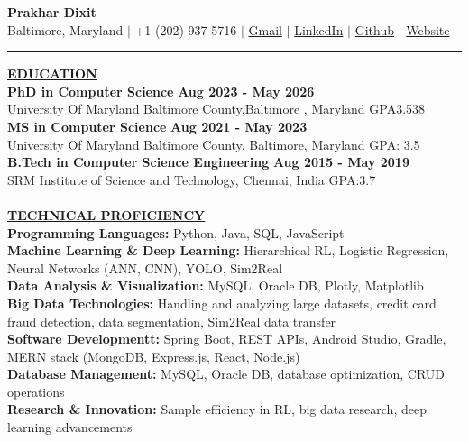 \documentclass{article}
\begin{document}
\begin{center}
\thispagestyle{empty}
\large \textbf{\textbf{Prakhar Dixit}  \\}
\normalsize Baltimore, Maryland $\mid$ +1 (202)-937-5716 $\mid$ \href{mailto:prakhhar1997@gmail.com}{Gmail} $\mid$ \href{https://www.linkedin.com/in/prakhardixit250697/}{LinkedIn} $\mid$  \href{https://github.com/pdx97}{Github} $\mid$  \href{https://pdx97.github.io/}{Website}  \\
\rule{\textwidth}{1pt}
\end{center}

\noindent \textbf{\underline{EDUCATION}} \\
\textbf{PhD in Computer Science} \hfill \textbf{Aug 2023 - May 2026} \\
University Of Maryland Baltimore County,Baltimore , Maryland {GPA3.538} \\
\textbf{MS in Computer Science} \hfill \textbf{Aug 2021 - May 2023} \\
University Of Maryland Baltimore County, Baltimore, Maryland {GPA: 3.5} \\
\textbf{B.Tech in Computer Science Engineering} \hfill \textbf{Aug 2015 - May 2019} \\
SRM Institute of Science and Technology, Chennai, India {GPA:3.7 }
 \\\\
\noindent \textbf{\underline{TECHNICAL PROFICIENCY}} \\
\textbf{Programming Languages:}{ \small  Python, Java, SQL, JavaScript} \\
\textbf{Machine Learning \& Deep Learning:} {\small Hierarchical RL, Logistic Regression, Neural Networks (ANN, CNN), YOLO, Sim2Real}\\
\textbf{Data Analysis \& Visualization:}{ \small  MySQL, Oracle DB, Plotly, Matplotlib}\\
\textbf{Big Data Technologies:}{ \small Handling and analyzing large datasets, credit card fraud detection, data segmentation, Sim2Real data transfer  }\\
\textbf{Software Developmentt:}{ \small Spring Boot, REST APIs, Android Studio, Gradle, MERN stack (MongoDB, Express.js, React, Node.js) }\\
\textbf{Database Management:}{ \small MySQL, Oracle DB, database optimization, CRUD operations}\\
\textbf{Research \& Innovation:}{ \small Sample efficiency in RL, big data research, deep learning advancements}
 
\end{document}
